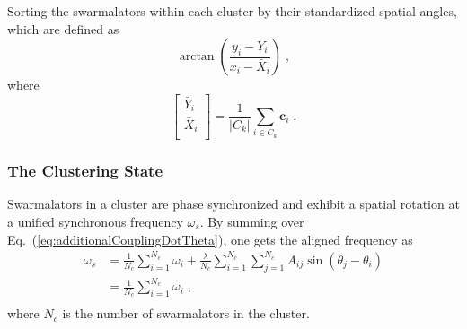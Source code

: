 \documentclass{article}
\begin{document}
Sorting the swarmalators within each cluster by their standardized spatial angles, which are defined as
\begin{equation}
    \arctan \left( \frac{y_i-\bar{Y}_i}{x_i-\bar{X}_i} \right)\;,
\end{equation}
where 
\begin{equation}
    \left[ \begin{array}{c}
        \bar{Y}_i\\
        \bar{X}_i\\
    \end{array} \right] =\frac{1}{\left| C_k \right|}\sum_{i\in C_k}{\mathbf{c}_i}\;.
\end{equation}

\subsubsection{The Clustering State}
Swarmalators in a cluster are phase synchronized and exhibit a spatial rotation at a unified synchronous frequency $\omega_s$. By summing over Eq.~(\ref{eq:additionalCouplingDotTheta}), one gets the aligned frequency as
\begin{equation}
    \label{eq:clusterState}
    \begin{aligned}
        \omega _s&=\frac{1}{N_c}\sum_{i=1}^{N_c}{\omega _i}+\frac{\lambda}{N_c}\sum_{i=1}^{N_c}{\sum_{j=1}^{N_c}{A_{ij}\sin \left( \theta _j-\theta _i \right)}}\\
        &=\frac{1}{N_c}\sum_{i=1}^{N_c}{\omega _i}\;,\\
    \end{aligned}
\end{equation}
where $N_c$ is the number of swarmalators in the cluster.


\end{document}

